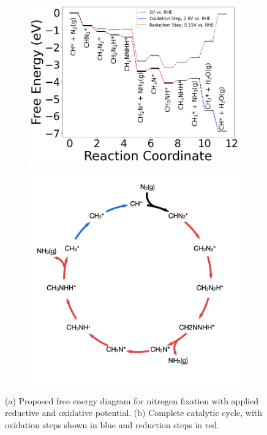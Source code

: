 \begin{figure}[h]
    \centering
    \begin{subfigure}[t]{0.44\textwidth}
        \centering
        \includegraphics[width=\textwidth]{figures/proposal_figures/CH_RHE.png}
        \caption{}
        \label{fig:CH_RHE_a}
    \end{subfigure}
    \hfill
    \begin{subfigure}[t]{0.44\textwidth}
        \centering
        \includegraphics[width=\textwidth]{figures/proposal_figures/catalytic_cycle.pdf}
        \caption{}
        \label{fig:CH_RHE_b}
    \end{subfigure}
    \caption{(a) Proposed free energy diagram for nitrogen fixation with applied reductive and oxidative potential. (b) Complete catalytic cycle, with oxidation steps shown in blue and reduction steps in red.}
    \label{fig:CH_RHE_combined}
\end{figure}

